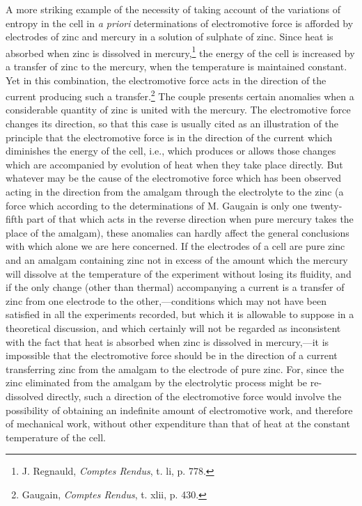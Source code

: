 \documentclass[12pt]{article}
\begin{document}
A more striking example of the necessity of taking account of the variations of entropy in the cell in \textit{a priori} determinations of electromotive force is afforded by electrodes of zinc and mercury in a solution of sulphate of zinc. Since heat is absorbed when zinc is dissolved in mercury,\footnote{J. Regnauld, \textit{Comptes Rendus}, t. li, p. 778.} the energy of the cell is increased by a transfer of zinc to the mercury, when the temperature is maintained constant. Yet in this combination, the electromotive force acts in the direction of the current producing such a transfer.\footnote{Gaugain, \textit{Comptes Rendus}, t. xlii, p. 430.} The couple presents certain anomalies when a considerable quantity of zinc is united with the mercury. The electromotive force changes its direction, so that this case is usually cited as an illustration of the principle that the electromotive force is in the direction of the current which diminishes the energy of the cell, i.e., which produces or allows those changes which are accompanied by evolution of heat when they take place directly. But whatever may be the cause of the electromotive force which has been observed acting in the direction from the amalgam through the electrolyte to the zinc (a force which according to the determinations of M. Gaugain is only one twenty-fifth part of that which acts in the reverse direction when pure mercury takes the place of the amalgam), these anomalies can hardly affect the general conclusions with which alone we are here concerned. If the electrodes of a cell are pure zinc and an amalgam containing zinc not in excess of the amount which the mercury will dissolve at the temperature of the experiment without losing its fluidity, and if the only change (other than thermal) accompanying a current is a transfer of zinc from one electrode to the other,---conditions which may not have been satisfied in all the experiments recorded, but which it is allowable to suppose in a theoretical discussion, and which certainly will not be regarded as inconsistent with the fact that heat is absorbed when zinc is dissolved in mercury,---it is impossible that the electromotive force should be in the direction of a current transferring zinc from the amalgam to the electrode of pure zinc. For, since the zinc eliminated from the amalgam by the electrolytic process might be re-dissolved directly, such a direction of the electromotive force would involve the possibility of obtaining an indefinite amount of electromotive work, and therefore of mechanical work, without other expenditure than that of heat at the constant temperature of the cell.
\end{document}
